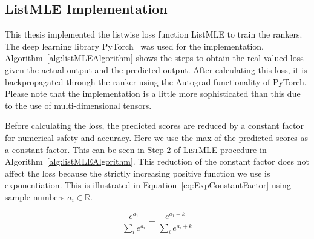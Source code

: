 \documentclass[12pt, twoside, ngerman]{report}
\begin{document}

\subsection{ListMLE Implementation}

This thesis implemented the listwise loss function ListMLE to train the rankers. The deep learning library PyTorch~\cite{PyTorch} was used for the implementation.
Algorithm~\ref{alg:listMLEAlgorithm} shows the steps to obtain the real-valued loss given the actual output and the predicted output.
After calculating this loss, it is backpropagated through the ranker using the Autograd functionality of PyTorch.
Please note that the implementation is a little more sophisticated than this due to the use of multi-dimensional tensors.

Before calculating the loss, the predicted scores are reduced by a constant factor for numerical safety and accuracy. Here we use the max of the predicted scores as a constant factor. This can be seen in Step 2 of \textsc{ListMLE} procedure in Algorithm~\ref{alg:listMLEAlgorithm}.
This reduction of the constant factor does not affect the loss because the strictly increasing positive function we use is exponentiation. This is illustrated in Equation~\ref{eq:ExpConstantFactor} using sample numbers $a_i \in  \mathbb{R}$.

\begin{equation}
\label{eq:ExpConstantFactor}
\frac{e^{a_1}}{\sum\limits_{i} e^{a_i}} = \frac{e^{a_1 + k}}{\sum\limits_{i} e^{a_i + k}} 
\end{equation}
\end{document}
